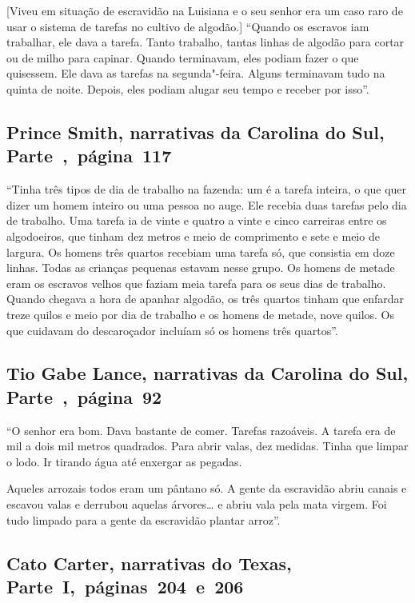 {[}Viveu em situação de escravidão na Luisiana e o seu senhor era um caso raro de usar o %
sistema de tarefas no cultivo de algodão.{]} ``Quando os escravos iam
trabalhar, ele dava a tarefa. Tanto trabalho, tantas linhas de algodão
para cortar ou de milho para capinar. Quando terminavam, eles podiam
fazer o que quisessem. Ele dava as tarefas na segunda"-feira. Alguns
terminavam tudo na quinta de noite. Depois, eles podiam alugar seu tempo
e receber por isso''.

\subsection{Prince Smith, narrativas da Carolina do Sul, Parte~,~página~117}
\label{ref247}

``Tinha três tipos de dia de trabalho na fazenda: um é a tarefa inteira,
o que quer dizer um homem inteiro ou uma pessoa no auge. Ele recebia duas
tarefas pelo dia de trabalho. Uma tarefa ia de vinte e quatro a vinte e
cinco carreiras entre os algodoeiros, que tinham dez metros e meio de
comprimento e sete e meio de largura. Os homens três quartos recebiam
uma tarefa só, que consistia em doze linhas. Todas as crianças pequenas
estavam nesse grupo. Os homens de metade eram os escravos velhos que
faziam meia tarefa para os seus dias de trabalho. Quando chegava a hora
de apanhar algodão, os três quartos tinham que enfardar treze quilos e
meio por dia de trabalho e os homens de metade, nove quilos. Os que
cuidavam do descaroçador incluíam só os homens três quartos''.

\subsection{Tio Gabe Lance, narrativas da Carolina do Sul, Parte~,~página~92}
\label{ref168}

``O senhor era bom. Dava bastante de comer. Tarefas razoáveis. A tarefa
era de mil a dois mil metros quadrados. Para abrir valas, dez medidas.
Tinha que limpar o lodo. Ir tirando água até enxergar as pegadas.

Aqueles arrozais todos eram um pântano só. A gente da escravidão abriu
canais e escavou valas e derrubou aquelas árvores\ldots{} e abriu vala
pela mata virgem. Foi tudo limpado para a gente da escravidão plantar
arroz''.

\subsection{Cato Carter, narrativas do Texas, Parte~I,~páginas~204~e~206} \label{ref51}

